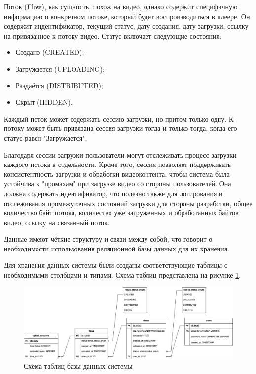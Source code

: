 	Поток (Flow), как сущность, похож на видео, однако содержит специфичную информацию о конкретном потоке, который будет воспроизводиться в плеере. Он содержит индентификатор, текущий статус, дату создания, дату загрузки, ссылку на привязанное к потоку видео. Статус включает следующие состояния:
	\begin{itemize}[label=$\bullet$]
		\item Создано (CREATED);
		\item Загружается (UPLOADING);
		\item Раздаётся (DISTRIBUTED);
		\item Скрыт (HIDDEN).
	\end{itemize}

	Каждый поток может содержать сессию загрузки, но притом только одну. К потоку может быть привязана сессия загрузки тогда и только тогда, когда его статус равен "Загружается".

	Благодаря сессии загрузки пользователи могут отслеживать процесс загрузки каждого потока в отдельности. Кроме того, сессия позволяет поддерживать консистентность загрузки и обработки видеоконтента, чтобы система была устойчива к "промахам" при загрузке видео со стороны пользователей. Она должна содержать идентификатор, что полезно также для логирования и отслеживания промежуточных состояний загрузки для стороны разработки, общее количество байт потока, количество уже загруженных и обработанных байтов видео, ссылку на связанный поток.
	
	Данные имеют чёткие структуру и связи между собой, что говорит о необходимости использования реляционной базы данных для их хранения.

	Для хранения данных системы были созданы соответствующие таблицы с необходимыми столбцами и типами. Схема таблиц представлена на рисунке \ref{fig:db_scheme}.
	\begin{figure}[ht!] 
		\center
		\includegraphics [scale=0.37] {my_folder/images//db_scheme}
		\caption{Схема таблиц базы данных системы} 
		\label{fig:db_scheme}  
	\end{figure}

